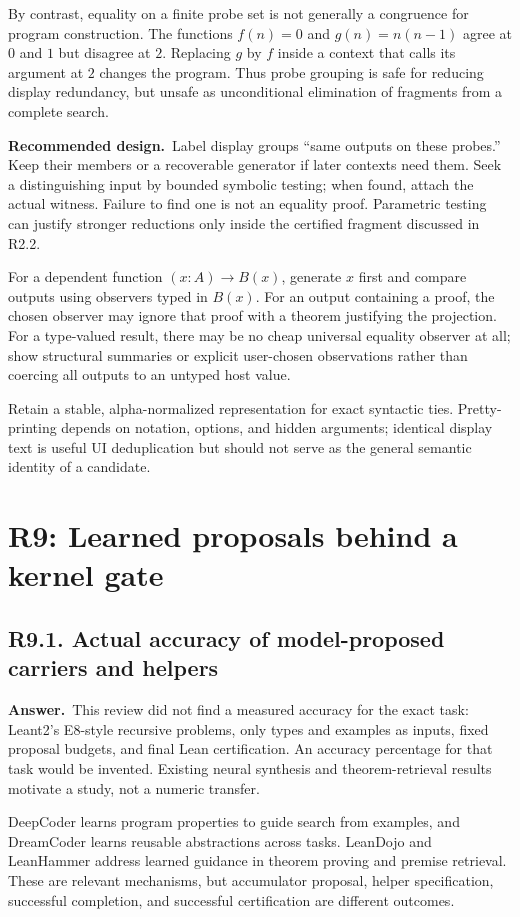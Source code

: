 \documentclass[11pt,a4paper]{article}
\newcommand{\qid}[3]{\subsection{#2. #3}\label{#1}}
\newcommand{\answer}{\noindent\textbf{Answer.}\ }
\newcommand{\proposal}{\noindent\textbf{Recommended design.}\ }
\theoremstyle{remark}
\begin{document}
By contrast, equality on a finite probe set is not generally a congruence for program construction. The functions $f(n)=0$ and $g(n)=n(n-1)$ agree at $0$ and $1$ but disagree at $2$. Replacing $g$ by $f$ inside a context that calls its argument at $2$ changes the program. Thus probe grouping is safe for reducing display redundancy, but unsafe as unconditional elimination of fragments from a complete search.

\proposal Label display groups ``same outputs on these probes.'' Keep their members or a recoverable generator if later contexts need them. Seek a distinguishing input by bounded symbolic testing; when found, attach the actual witness. Failure to find one is not an equality proof. Parametric testing can justify stronger reductions only inside the certified fragment discussed in R2.2.

For a dependent function $(x:A)\to B(x)$, generate $x$ first and compare outputs using observers typed in $B(x)$. For an output containing a proof, the chosen observer may ignore that proof with a theorem justifying the projection. For a type-valued result, there may be no cheap universal equality observer at all; show structural summaries or explicit user-chosen observations rather than coercing all outputs to an untyped host value.

Retain a stable, alpha-normalized representation for exact syntactic ties. Pretty-printing depends on notation, options, and hidden arguments; identical display text is useful UI deduplication but should not serve as the general semantic identity of a candidate.

\section{R9: Learned proposals behind a kernel gate}\label{sec:r9}

\qid{q91}{R9.1}{Actual accuracy of model-proposed carriers and helpers}
\answer This review did not find a measured accuracy for the exact task: Leant2's E8-style recursive problems, only types and examples as inputs, fixed proposal budgets, and final Lean certification. An accuracy percentage for that task would be invented. Existing neural synthesis and theorem-retrieval results motivate a study, not a numeric transfer.

DeepCoder learns program properties to guide search from examples, and DreamCoder learns reusable abstractions across tasks. LeanDojo and LeanHammer address learned guidance in theorem proving and premise retrieval. These are relevant mechanisms, but accumulator proposal, helper specification, successful completion, and successful certification are different outcomes.~\cite{deepcoder,dreamcoder,leandojo,leanhammer}
\end{document}
